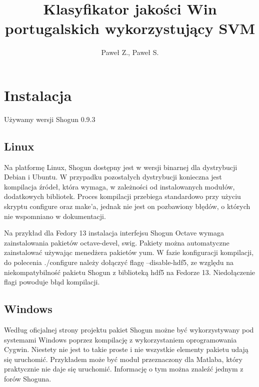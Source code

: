 \documentclass[10pt,a4paper]{article}
\author{Paweł Z., Paweł S.}
\title{Klasyfikator jakości Win portugalskich wykorzystujący SVM}
\begin{document}
\maketitle
\section{Instalacja}
Używamy wersji Shogun 0.9.3
\subsection{Linux}

Na platformę Linux, Shogun dostępny jest w wersji binarnej dla dystrybucji Debian i Ubuntu.
W przypadku pozostałych dystrybucji konieczna jest kompilacja źródeł, która wymaga, w zależności od 
instalowanych modułów, dodatkowych bibliotek. Proces kompilacji przebiega standardowo przy użyciu skryptu configure oraz make'a, jednak nie jest on pozbawiony błędów, o których nie wspomniano w dokumentacji.

Na przykład dla Fedory 13 instalacja interfejsu Shogun Octave wymaga zainstalowania pakietów octave-devel, swig. Pakiety można automatyczne zainstalować używając menedżera pakietów yum. W fazie konfiguracji kompilacji, do polecenia ./configure należy dołączyć flagę --disable-hdf5, ze względu na niekompatybilność pakietu Shogun z biblioteką hdf5 na Fedorze 13. Niedołączenie flagi powoduje błąd kompilacji. 


\subsection{Windows}

Według oficjalnej strony projektu pakiet Shogun możne być wykorzystywany pod systemami Windows poprzez kompilację z wykorzystaniem oprogramowania Cygwin.
Niestety nie jest to takie proste i nie wszystkie elementy pakietu udają się uruchomić. Przykładem może być moduł przeznaczony dla Matlaba, który praktycznie nie daje
się uruchomić. Informację o tym można znaleźć jednym z forów Shoguna.
\end{document}

